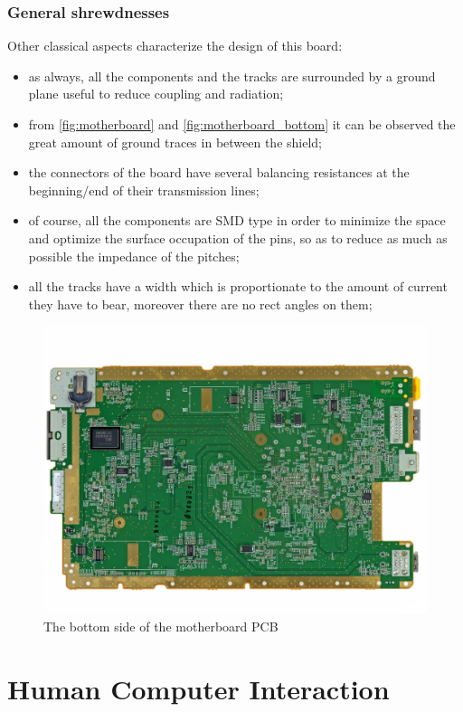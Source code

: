 \documentclass[11pt,a4paper,titlepage]{article}
\begin{document}
      \subsubsection{General shrewdnesses}
        Other classical aspects characterize the design of this board:
        \begin{itemize}
          \item as always, all the components and the tracks are surrounded by a ground plane useful to reduce coupling and radiation;
          \item from \autoref{fig:motherboard} and \autoref{fig:motherboard_bottom} it can be observed the great amount of ground traces in between the shield;
          \item the connectors of the board have several balancing resistances at the beginning/end of their transmission lines;
          \item of course, all the components are SMD type in order to minimize the space and optimize the surface occupation of the pins, so as to reduce as much as possible the impedance of the pitches;
          \item all the tracks have a width which is proportionate to the amount of current they have to bear, moreover there are no rect angles on them;
        \end{itemize}

        \begin{figure}[htbp]
          \centering
          \includegraphics[width = .8\textwidth]{motherboard_back.png}
          \caption{The bottom side of the motherboard PCB}
          \label{fig:motherboard_bottom}
        \end{figure}

	\section{Human Computer Interaction}
\end{document}
